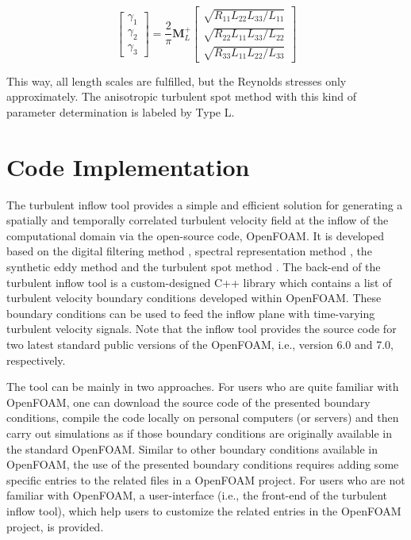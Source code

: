 \begin{equation}
\begin{bmatrix}
\gamma_1 \\
\gamma_2 \\
\gamma_3
\end{bmatrix}=\frac{2}{\pi}\boldsymbol{M}_L^+
\begin{bmatrix}
\sqrt{R_{11}L_{22}L_{33}/L_{11}} \\
\sqrt{R_{22}L_{11}L_{33}/L_{22}} \\
\sqrt{R_{33}L_{11}L_{22}/L_{33}}
\end{bmatrix}
\end{equation}

\noindent This way, all length scales are fulfilled, but the Reynolds stresses only approximately. The anisotropic turbulent spot method with this kind of parameter determination is labeled by Type L.

\section{Code Implementation}

The turbulent inflow tool provides a simple and efficient solution for generating a spatially and temporally correlated turbulent velocity field at the inflow of the computational domain via the open-source code, OpenFOAM. It is developed based on the digital filtering method \citep{klein2003, xie2008}, spectral representation method \citep{melaku2021divergence}, the synthetic eddy method \citep{jarrin2006, poletto2013} and the turbulent spot method \cite{kroger2018}. The back-end of the turbulent inflow tool is a custom-designed C++ library which contains a list of turbulent velocity boundary conditions developed within OpenFOAM. These boundary conditions can be used to feed the inflow plane with time-varying turbulent velocity signals. Note that the inflow tool provides the source code for two latest standard public versions of the OpenFOAM, i.e., version 6.0 and 7.0, respectively.

The tool can be mainly in two approaches. For users who are quite familiar with OpenFOAM, one can download the source code of the presented boundary conditions, compile the code locally on personal computers (or servers) and then carry out simulations as if those boundary conditions are originally available in the standard OpenFOAM. Similar to other boundary conditions available in OpenFOAM, the use of the presented boundary conditions requires adding some specific entries to the related files in a OpenFOAM project. For users who are not familiar with OpenFOAM, a user-interface (i.e., the front-end of the turbulent inflow tool), which help users to customize the related entries in the OpenFOAM project, is provided.


